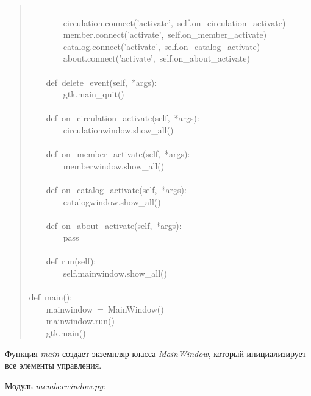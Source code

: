 \documentclass[a4paper,openany,twoside,final]{book}
\providecommand*{\DUroletitlereference}[1]{\textsl{#1}}
\begin{document}
\begin{quote}
{~\\
~~~~~~~~circulation.connect('activate',~self.on\_circulation\_activate)\\
~~~~~~~~member.connect('activate',~self.on\_member\_activate)\\
~~~~~~~~catalog.connect('activate',~self.on\_catalog\_activate)\\
~~~~~~~~about.connect('activate',~self.on\_about\_activate)\\
~\\
~~~~def~delete\_event(self,~*args):\\
~~~~~~~~gtk.main\_quit()\\
~\\
~~~~def~on\_circulation\_activate(self,~*args):\\
~~~~~~~~circulationwindow.show\_all()\\
~\\
~~~~def~on\_member\_activate(self,~*args):\\
~~~~~~~~memberwindow.show\_all()\\
~\\
~~~~def~on\_catalog\_activate(self,~*args):\\
~~~~~~~~catalogwindow.show\_all()\\
~\\
~~~~def~on\_about\_activate(self,~*args):\\
~~~~~~~~pass\\
~\\
~~~~def~run(self):\\
~~~~~~~~self.mainwindow.show\_all()\\
~\\
def~main():\\
~~~~mainwindow~=~MainWindow()\\
~~~~mainwindow.run()\\
~~~~gtk.main()
}
\end{quote}

Функция \DUroletitlereference{main} создает экземпляр класса \DUroletitlereference{MainWindow}, который
инициализирует все элементы управления.

Модуль \DUroletitlereference{memberwindow.py}:
\end{document}
